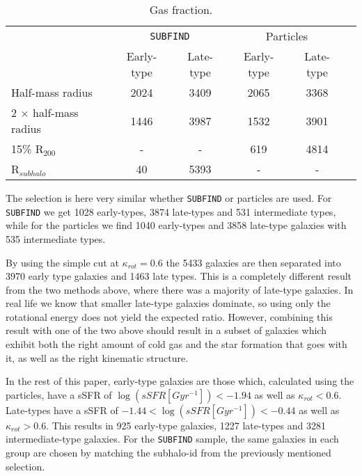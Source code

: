 \begin{table}
\begin{center}
\caption{Gas fraction.}
 \label{gas_frac}
\begin{tabular}{ l| c c c c c } 
 \hline
 \hline
   &\multicolumn{2}{c}{\texttt{SUBFIND}}&\multicolumn{2}{c}{Particles} \\
   &  Early-type & Late-type & Early-type & Late-type \\
 \hline
 Half-mass radius & 2024 & 3409 & 2065 & 3368 \\ 
 2 $\times$ half-mass radius & 1446 & 3987 & 1532 & 3901 \\ 
 15\% R$_{200}$ & - & - & 619 & 4814 \\ 
 R$_{subhalo}$ & 40 & 5393 & - & - \\ 
 \hline 
 \end{tabular}
\end{center}
\end{table}

The selection is here very similar whether \texttt{SUBFIND} or particles are used. For \texttt{SUBFIND} we get 1028 early-types, 3874 late-types and 531 intermediate types, while for the particles we find 1040 early-types and 3858 late-type galaxies with 535 intermediate types.

By using the simple cut at $\kappa_{rot} = 0.6$ the 5433 galaxies are then separated into 3970 early type galaxies and 1463 late types. This is a completely different result from the two methods above, where there was a majority of late-type galaxies. In real life we know that smaller late-type galaxies dominate, so using only the rotational energy does not yield the expected ratio. However, combining this result with one of the two above should result in a subset of galaxies which exhibit both the right amount of cold gas and the star formation that goes with it, as well as the right kinematic structure.

In the rest of this paper, early-type galaxies are those which, calculated using the particles, have a sSFR of $\log (sSFR[Gyr^{-1}]) < -1.94$ as well as $\kappa_{rot} < 0.6$. Late-types have a sSFR of $ -1.44 < \log (sSFR[Gyr^{-1}]) < -0.44$ as well as $\kappa_{rot} > 0.6$. This results in 925 early-type galaxies, 1227 late-types and 3281 intermediate-type galaxies. For the \texttt{SUBFIND} sample, the same galaxies in each group are chosen by matching the subhalo-id from the previously mentioned selection.